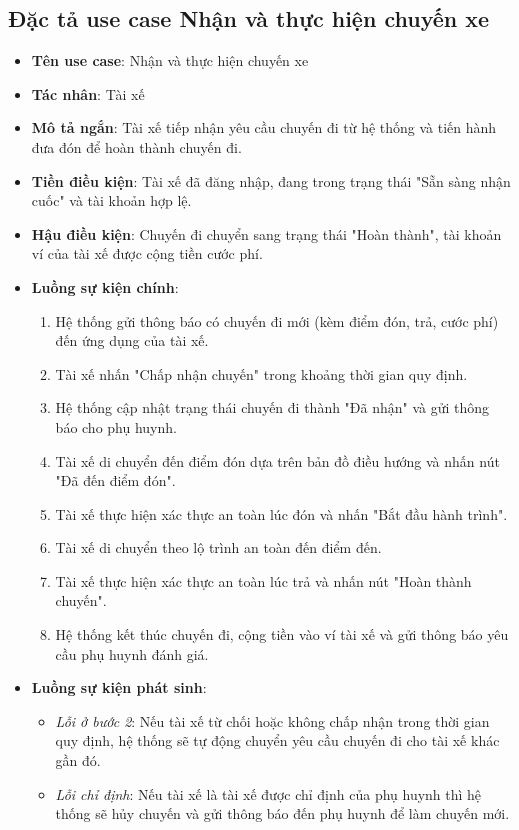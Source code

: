 \documentclass[../DoAn.tex]{subfiles}
\begin{document}
\subsection{Đặc tả use case Nhận và thực hiện chuyến xe}
\begin{itemize}
    \item \textbf{Tên use case}: Nhận và thực hiện chuyến xe
    \item \textbf{Tác nhân}: Tài xế
    \item \textbf{Mô tả ngắn}: Tài xế tiếp nhận yêu cầu chuyến đi từ hệ thống và tiến hành đưa đón để hoàn thành chuyến đi.
    \item \textbf{Tiền điều kiện}: Tài xế đã đăng nhập, đang trong trạng thái "Sẵn sàng nhận cuốc" và tài khoản hợp lệ.
    \item \textbf{Hậu điều kiện}: Chuyến đi chuyển sang trạng thái "Hoàn thành", tài khoản ví của tài xế được cộng tiền cước phí.
    \item \textbf{Luồng sự kiện chính}:
          \begin{enumerate}
              \item Hệ thống gửi thông báo có chuyến đi mới (kèm điểm đón, trả, cước phí) đến ứng dụng của tài xế.
              \item Tài xế nhấn "Chấp nhận chuyến" trong khoảng thời gian quy định.
              \item Hệ thống cập nhật trạng thái chuyến đi thành "Đã nhận" và gửi thông báo cho phụ huynh.
              \item Tài xế di chuyển đến điểm đón dựa trên bản đồ điều hướng và nhấn nút "Đã đến điểm đón".
              \item Tài xế thực hiện xác thực an toàn lúc đón và nhấn "Bắt đầu hành trình".
              \item Tài xế di chuyển theo lộ trình an toàn đến điểm đến.
              \item Tài xế thực hiện xác thực an toàn lúc trả và nhấn nút "Hoàn thành chuyến".
              \item Hệ thống kết thúc chuyến đi, cộng tiền vào ví tài xế và gửi thông báo yêu cầu phụ huynh đánh giá.
          \end{enumerate}
    \item \textbf{Luồng sự kiện phát sinh}:
          \begin{itemize}
              \item \textit{Lỗi ở bước 2}: Nếu tài xế từ chối hoặc không chấp nhận trong thời gian quy định, hệ thống sẽ tự động chuyển yêu cầu chuyến đi cho tài xế khác gần đó.
              \item \textit{Lỗi chỉ định}: Nếu tài xế là tài xế được chỉ định của phụ huynh thì hệ thống sẽ hủy chuyến và gửi thông báo đến phụ huynh để làm chuyến mới.
          \end{itemize}
\end{itemize}
\end{document}
